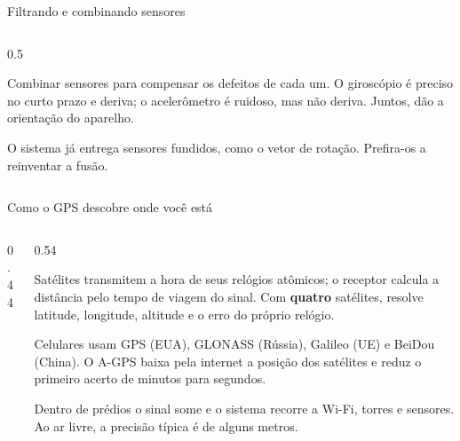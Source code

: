 \begin{frame}{Filtrando e combinando sensores}
\begin{columns}[c]
\begin{column}{0.5\textwidth}
\begin{conceito}
      \end{conceito}
      \begin{definicao}
        Combinar sensores para compensar os defeitos de cada um. O giroscópio é preciso no curto prazo e deriva; o acelerômetro é ruidoso, mas não deriva. Juntos, dão a orientação do aparelho.
      \end{definicao}
      \begin{dica}
        O sistema já entrega sensores fundidos, como o vetor de rotação. Prefira-os a reinventar a fusão.
      \end{dica}
    \end{column}
  \end{columns}
\end{frame}

\begin{frame}{Como o GPS descobre onde você está}
  \begin{columns}[c]
    \begin{column}{0.44\textwidth}
      \centering
    \end{column}
    \begin{column}{0.54\textwidth}
      \begin{definicao}
        Satélites transmitem a hora de seus relógios atômicos; o receptor calcula a distância pelo tempo de viagem do sinal. Com \textbf{quatro} satélites, resolve latitude, longitude, altitude e o erro do próprio relógio.
      \end{definicao}
      \begin{pordentro}
        Celulares usam GPS (EUA), GLONASS (Rússia), Galileo (UE) e BeiDou (China). O A-GPS baixa pela internet a posição dos satélites e reduz o primeiro acerto de minutos para segundos.
      \end{pordentro}
      \begin{atencao}
        Dentro de prédios o sinal some e o sistema recorre a Wi-Fi, torres e sensores. Ao ar livre, a precisão típica é de alguns metros.
      \end{atencao}
    \end{column}
  \end{columns}
\end{frame}

